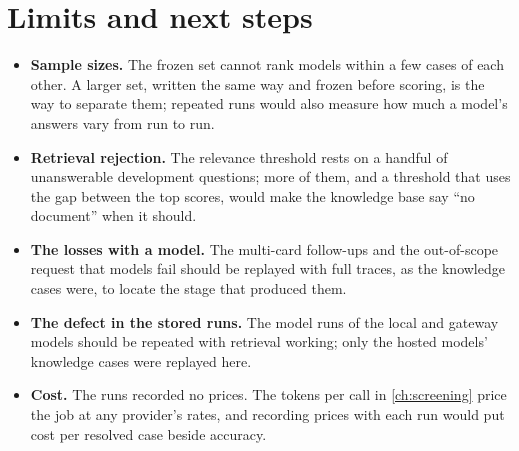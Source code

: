 \section{Limits and next steps}

\begin{itemize}[leftmargin=*]
  \item \textbf{Sample sizes.} The frozen set cannot rank models within a few cases of each other. A larger set,
  written the same way and frozen before scoring, is the way to separate them; repeated runs would also measure how
  much a model's answers vary from run to run.
  \item \textbf{Retrieval rejection.} The relevance threshold rests on a handful of unanswerable development
  questions; more of them, and a threshold that uses the gap between the top scores, would make the knowledge base say
  \enquote{no document} when it should.
  \item \textbf{The losses with a model.} The multi-card follow-ups and the out-of-scope request that models fail should
  be replayed with full traces, as the knowledge cases were, to locate the stage that produced them.
  \item \textbf{The defect in the stored runs.} The model runs of the local and gateway models should be repeated with
  retrieval working; only the hosted models' knowledge cases were replayed here.
  \item \textbf{Cost.} The runs recorded no prices. The tokens per call in \cref{ch:screening} price the job at any
  provider's rates, and recording prices with each run would put cost per resolved case beside accuracy.
\end{itemize}
